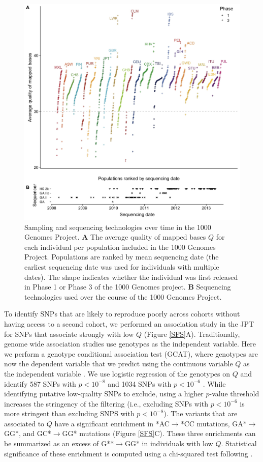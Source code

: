 \documentclass[9pt,article]{template}
\begin{document}
\begin{figure}
\includegraphics[width=0.95\hsize,keepaspectratio]{MapQualOverTime.jpg}

\caption{Sampling and sequencing technologies over time in the 1000 Genomes Project.
\textbf{A} The average quality of mapped bases $Q$ for each individual per population included in the 1000 Genomes Project. 
 Populations are ranked by mean sequencing date (the earliest sequencing date was used for individuals with multiple dates). 
The shape indicates whether the individual was first released in Phase 1 or Phase 3 of the 1000 Genomes project. 
\textbf{B} Sequencing technologies used over the course of the 1000 Genomes Project.}
\label{MapQual}
\end{figure}

To identify SNPs that are likely to reproduce poorly across cohorts without having access to a second cohort, we performed an association study in the JPT for SNPs that associate strongly with low $Q$ (Figure \ref{SFS}A).
Traditionally, genome wide association studies use genotypes as the independent variable. 
Here we perform a genotype conditional association test (GCAT), where genotypes are now the dependent variable that we predict using the continuous variable $Q$ as the independent variable \citep{song2015testing}.
We use logistic regression of the genotypes on $Q$ and identify 587 SNPs with $p < 10^{-8}$ and 1034 SNPs with $ p < 10^{-6}$ . 
While identifying putative low-quality SNPs to exclude, using a higher $p$-value threshold increases the stringency of the filtering (i.e., excluding SNPs with $ p < 10^{-6}$ is more stringent than excluding SNPS with $p < 10^{-8}$). 
The variants that are associated to $Q$ have a significant enrichment in *AC${\rightarrow}$*CC mutations, GA*${\rightarrow}$GG*, and GC*${\rightarrow}$GG* mutations (Figure \ref{SFS}C).
These three enrichments can be summarized as an excess of G**${\rightarrow}$GG* in individuals with low $Q$.
Statistical significance of these enrichment is computed using a chi-squared test following \cite{Harris2017a}.
\end{document}

